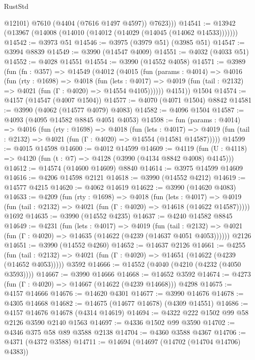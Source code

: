 \begin{lexlean}{RustStd}
\begin{coremodule}
            @12101)
          @7610
          (@4404 (@7616 @1497 @4597))
          @7623)))
@14541 := @13942 (@13967 (@14008 (@14010 (@14012 (@14029 (@14045 (@14062 @14533)))))))
@14542 := @3973 @51
@14546 := @3975 (@3979 @51) (@3985 @51)
@14547 := @3994 @8839
@14549 := @3990 (@14547 @4009)
@14551 := @4032 (@4033 @51)
@14552 := @4028 @14551
@14554 := @3990 (@14552 @4058)
@14571 := @3989
    (fun (fn : @357) =>
    @14549
      (@4012
        (@4015
          (fun (params : @4014) =>
          @4016
            (fun (rty : @1698) =>
            @4018
              (fun (lets : @4017) =>
              @4019 (fun (tail : @2132) => @4021 (fun (Γ : @4020) => @14554 @4105))))))
        @4151))
    @1504
@14574 := @4157 (@14547 (@4007 @1504))
@14577 := @4070 (@4071 @1504) @8842
@14581 := @3990 (@4062 (@14577 @4079) @4083)
@14582 := @4096 @1504
@14587 := @4093 (@4095 @14582 @8845 @4051 @4053)
@14598 := fun (params : @4014) =>
  @4016
    (fun (rty : @1698) =>
    @4018
      (fun (lets : @4017) =>
      @4019 (fun (tail : @2132) => @4021 (fun (Γ : @4020) => @14554 (@14581 @14587)))))
@14599 := @4015 @14598
@14600 := @4012 @14599
@14609 := @4119 (fun (U : @4118) => @4120 (fun (t : @7) => @4128 (@3990 (@4134 @8842 @4008) @4145)))
@14612 := @14574 (@14600 @14609) @8840
@14614 := @3975 @14599 @14609
@14616 := @4206 @14598 @2121
@14618 := @3990 (@14552 @4212)
@14619 := @14577 @4215
@14620 := @4062 @14619
@14622 := @3990 (@14620 @4083)
@14633 := @4209
    (fun (rty : @1698) =>
    @4018
      (fun (lets : @4017) =>
      @4019 (fun (tail : @2132) => @4021 (fun (Γ : @4020) => @14618 (@14622 @14587)))))
    @1692
@14635 := @3990 (@14552 @4235)
@14637 := @4240 @14582 @8845
@14649 := @4231
    (fun (lets : @4017) =>
    @4019
      (fun (tail : @2132) =>
      @4021 (fun (Γ : @4020) => @14635 (@14622 (@4239 (@14637 @4051 @4053))))))
    @2126
@14651 := @3990 (@14552 @4260)
@14652 := @14637 @2126
@14661 := @4255
    (fun (tail : @2132) => @4021 (fun (Γ : @4020) => @14651 (@14622 (@4239 (@14652 @4053)))))
    @3592
@14666 := @14552 (@4040 (@4210 (@4232 (@4050 @3593))))
@14667 := @3990 @14666
@14668 := @14652 @3592
@14674 := @4273 (fun (Γ : @4020) => @14667 (@14622 (@4239 @14668))) @4298
@14675 := @4157 @14666
@14676 := @14620 @4301
@14677 := @3990 @14676
@14678 := @4305 @14668
@14682 := @14675 (@14677 @14678) (@4309 @14551)
@14686 := @4157 @14676 @14678 (@4314 @14619)
@14694 := @4322 @222 @1502 @99 @58 @2126 @3590 @2140 @1563
@14697 := @4336 @1502 @99 @3590
@14702 := @4346 @375 @58 @89 @3588 @2138
@14704 := @4360 @3588 @4367
@14706 := @4371 (@4372 @3588)
@14711 := @14694 (@14697 (@14702 (@14704 @14706) @4383))

\end{coremodule}
\end{lexlean}
